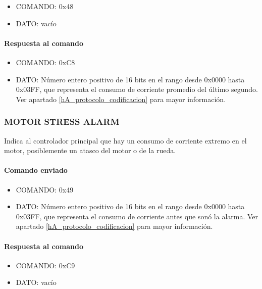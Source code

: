 \begin{itemize}
	\item{COMANDO:} 0x48
	\item{DATO:} vac\'io
\end{itemize}

\paragraph*{Respuesta al comando}

\begin{itemize}
	\item{COMANDO:} 0xC8
	\item{DATO:} N\'umero entero positivo de 16 bits en el rango desde 0x0000 hasta 0x03FF, que representa el consumo de corriente promedio del \'ultimo segundo.
		Ver apartado \ref{hA_protocolo_codificacion} para mayor informaci\'on.
\end{itemize}

\subsubsection{MOTOR STRESS ALARM}
\label{hA_protocolo_motor_stress_alarm}

Indica al controlador principal que hay un consumo de corriente extremo en el motor, posiblemente un atasco del motor o de la rueda.

\paragraph*{Comando enviado}

\begin{itemize}
	\item{COMANDO:} 0x49
	\item{DATO:} N\'umero entero positivo de 16 bits en el rango desde 0x0000 hasta 0x03FF, que representa el consumo de corriente antes que son\'o la alarma.
		Ver apartado \ref{hA_protocolo_codificacion} para mayor informaci\'on.
\end{itemize}

\paragraph*{Respuesta al comando}

\begin{itemize}
	\item{COMANDO:} 0xC9
	\item{DATO:} vac\'io
\end{itemize}

